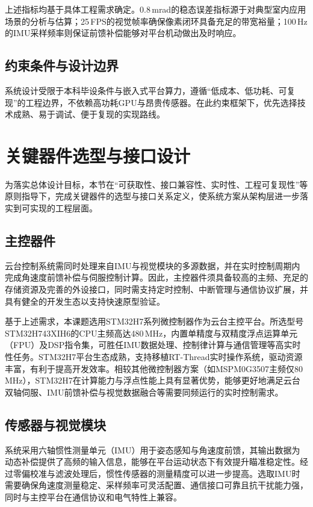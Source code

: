 上述指标均基于具体工程需求确定。0.8\,mrad的稳态误差指标源于对典型室内应用场景的分析与估算；25\,FPS的视觉帧率确保像素闭环具备充足的带宽裕量；100\,Hz的IMU采样频率则保证前馈补偿能够对平台机动做出及时响应。

\subsection{约束条件与设计边界}

系统设计受限于本科毕设条件与嵌入式平台算力，遵循``低成本、低功耗、可复现''的工程边界，不依赖高功耗GPU与昂贵传感器。在此约束框架下，优先选择技术成熟、易于调试、便于复现的实现路线。

\section{关键器件选型与接口设计}

为落实总体设计目标，本节在``可获取性、接口兼容性、实时性、工程可复现性''等原则指导下，完成关键器件的选型与接口关系定义，使系统方案从架构层进一步落实到可实现的工程层面。

\subsection{主控器件}

云台控制系统需同时处理来自IMU与视觉模块的多源数据，并在实时控制周期内完成角速度前馈补偿与伺服控制计算。因此，主控器件须具备较高的主频、充足的存储资源及完善的外设接口，同时需支持定时控制、中断管理与通信协议扩展，并具有健全的开发生态以支持快速原型验证。

基于上述需求，本课题选用STM32H7系列微控制器作为云台主控平台。所选型号STM32H743XIH6的CPU主频高达480\,MHz，内置单精度与双精度浮点运算单元（FPU）及DSP指令集，可胜任IMU数据处理、控制律计算与通信管理等高实时性任务。STM32H7平台生态成熟，支持移植RT-Thread实时操作系统，驱动资源丰富，有利于提高开发效率。相较其他微控制器方案（如MSPM0G3507主频仅80\,MHz），STM32H7在计算能力与浮点性能上具有显著优势，能够更好地满足云台双轴伺服、IMU前馈补偿与视觉数据融合等需要同频运行的实时控制需求。

\subsection{传感器与视觉模块}

系统采用六轴惯性测量单元（IMU）用于姿态感知与角速度前馈，其输出数据为动态补偿提供了高频的输入信息，能够在平台运动状态下有效提升瞄准稳定性。经过零偏校准与滤波处理后，惯性传感器的测量精度可以进一步提高。选取IMU时需要确保角速度测量稳定、采样频率可灵活配置、通信接口可靠且抗干扰能力强，同时与主控平台在通信协议和电气特性上兼容。

